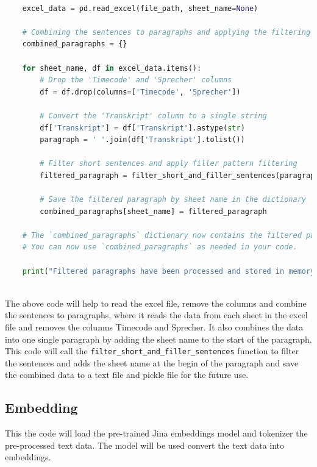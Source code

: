 \begin{lstlisting}[language=Python, caption={Removing columns and combining the sentences to paragraphs}]

    excel_data = pd.read_excel(file_path, sheet_name=None)

    # Combining the sentences to paragraphs and applying the filtering
    combined_paragraphs = {}
    
    for sheet_name, df in excel_data.items():
        # Drop the 'Timecode' and 'Sprecher' columns
        df = df.drop(columns=['Timecode', 'Sprecher'])
        
        # Convert the 'Transkript' column to a single string
        df['Transkript'] = df['Transkript'].astype(str)
        paragraph = ' '.join(df['Transkript'].tolist())
        
        # Filter short sentences and apply filler pattern filtering
        filtered_paragraph = filter_short_and_filler_sentences(paragraph, filler_words, min_words, min_unique_words, min_characters)
        
        # Save the filtered paragraph by sheet name in the dictionary
        combined_paragraphs[sheet_name] = filtered_paragraph
    
    # The `combined_paragraphs` dictionary now contains the filtered paragraphs for each sheet in memory.
    # You can now use `combined_paragraphs` as needed in your code.
    
    print("Filtered paragraphs have been processed and stored in memory.")
        
\end{lstlisting}

The above code will help to read the excel file, remove the columns and combine the sentences to paragraphs, where it reads the data from each sheet in the excel file and removes the columns Timecode and Sprecher. 
It also combines the data into one single paragraph by adding the sheet name to the start of the paragraph. This code will call the \texttt{filter\_short\_and\_filler\_sentences} function
 to filter the sentences and adds the sheet name at the begin of the paragraph and save the 
combined data to a text file and pickle file for the future use.


\subsection{Embedding}
 This the code will load the pre-trained Jina embeddings model and tokenizer the pre-processed text data. 
 The model will be used convert the text data into embeddings.

